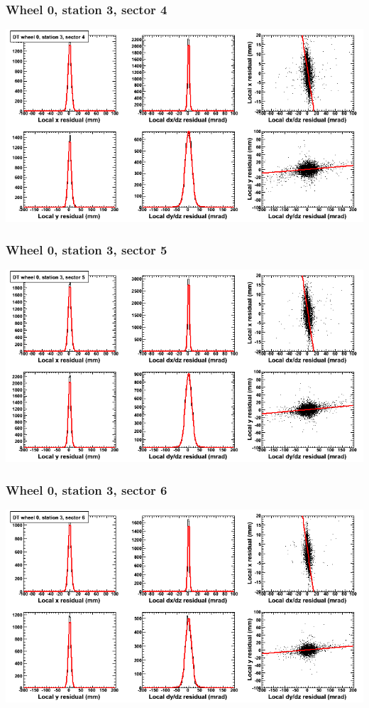 \documentclass[compress]{beamer}
\begin{document}
\begin{frame}
\frametitle{Wheel 0, station 3, sector 4}
\includegraphics[width=\linewidth]{tmpbell_MBwhCst3sec04.png}
\end{frame}

\begin{frame}
\frametitle{Wheel 0, station 3, sector 5}
\includegraphics[width=\linewidth]{tmpbell_MBwhCst3sec05.png}
\end{frame}

\begin{frame}
\frametitle{Wheel 0, station 3, sector 6}
\includegraphics[width=\linewidth]{tmpbell_MBwhCst3sec06.png}
\end{frame}
\end{document}

